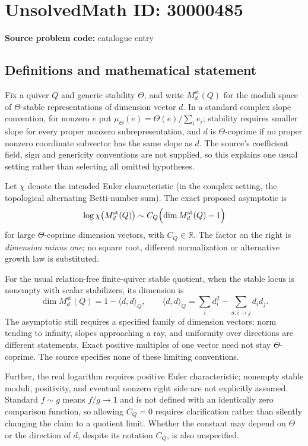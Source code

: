 \documentclass[11pt]{article}
\newcommand{\R}{\mathbb{R}}
\begin{document}
\section*{UnsolvedMath ID: 30000485}
\textbf{Source problem code:} catalogue entry
\subsection{Definitions and mathematical statement}
Fix a quiver $Q$ and generic stability $\Theta$, and write $M_d^{\mathrm{st}}(Q)$ for the moduli space of $\Theta$-stable representations of dimension vector $d$. In a standard complex slope convention, for nonzero $e$ put $\mu_\Theta(e)=\Theta(e)/\sum_i e_i$; stability requires smaller slope for every proper nonzero subrepresentation, and $d$ is $\Theta$-coprime if no proper nonzero coordinate subvector has the same slope as $d$. The source's coefficient field, sign and genericity conventions are not supplied, so this explains one usual setting rather than selecting all omitted hypotheses.

Let $\chi$ denote the intended Euler characteristic (in the complex setting, the topological alternating Betti-number sum). The exact proposed asymptotic is
\[
 \log\chi\bigl(M_d^{\mathrm{st}}(Q)\bigr)
 \sim C_Q\Bigl(\dim M_d^{\mathrm{st}}(Q)-1\Bigr)
\]
for large $\Theta$-coprime dimension vectors, with $C_Q\in\R$. The factor on the right is \emph{dimension minus one}; no square root, different normalization or alternative growth law is substituted.

For the usual relation-free finite-quiver stable quotient, when the stable locus is nonempty with scalar stabilizers, its dimension is
\[
 \dim M_d^{\mathrm{st}}(Q)=1-\langle d,d\rangle_Q,
 \qquad \langle d,d\rangle_Q=\sum_i d_i^2-\sum_{a:i\to j}d_id_j.
\]
The asymptotic still requires a specified family of dimension vectors: norm tending to infinity, slopes approaching a ray, and uniformity over directions are different statements. Exact positive multiples of one vector need not stay $\Theta$-coprime. The source specifies none of these limiting conventions.

Further, the real logarithm requires positive Euler characteristic; nonempty stable moduli, positivity, and eventual nonzero right side are not explicitly assumed. Standard $f\sim g$ means $f/g\to1$ and is not defined with an identically zero comparison function, so allowing $C_Q=0$ requires clarification rather than silently changing the claim to a quotient limit. Whether the constant may depend on $\Theta$ or the direction of $d$, despite its notation $C_Q$, is also unspecified.
\end{document}
